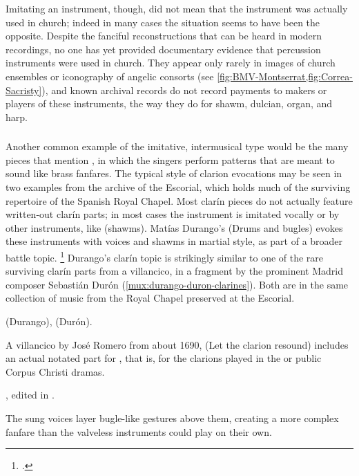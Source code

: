 Imitating an instrument, though, did not mean that the instrument was actually
used in church; indeed in many cases the situation seems to have been the
opposite.
Despite the fanciful reconstructions that can be heard in modern recordings, no
one has yet provided documentary evidence that percussion instruments were used
in church.
They appear only rarely in images of church ensembles or iconography of angelic
consorts (see \cref{fig:BMV-Montserrat,fig:Correa-Sacristy}), and known
archival records do not record payments to makers or players of these
instruments, the way they do for shawm, dulcian, organ, and harp.%
    \citXXX[evidence needed]

\subsubsection{}

Another common example of the imitative, intermusical type would be the many
pieces that mention  , in which the
singers perform patterns that are meant to sound like brass fanfares.
The typical style of clarion evocations may be seen in two examples from the
archive of the Escorial, which holds much of the surviving repertoire of the
Spanish Royal Chapel.
Most clarín pieces do not actually feature written-out clarín parts; in most
cases the instrument is imitated vocally or by other instruments, like
 (shawms).
Matías Durango's  (Drums and bugles) evokes these
instruments with voices and shawms in martial style, as part of a broader
battle topic.%
    \footnote{.}
Durango's clarín topic is strikingly similar to one of the rare surviving
clarín parts from a villancico, in a fragment by the prominent Madrid composer
Sebastián Durón (\cref{mux:durango-duron-clarines}). 
Both are in the same collection of music from the Royal Chapel preserved at the
Escorial.%
\begin{Footnote}
     (Durango),  (Durón).
\end{Footnote}
A villancico by José Romero from about 1690,  (Let the
clarion resound) includes an actual notated part for , that is, for the clarions played in the 
or public Corpus Christi dramas.%
\begin{Footnote} 
    , edited in \autocite[655--661]{CaberoPueyo:PhD}.
\end{Footnote}
The sung voices layer bugle-like gestures above them, creating a more complex
fanfare than the valveless instruments could play on their own.

